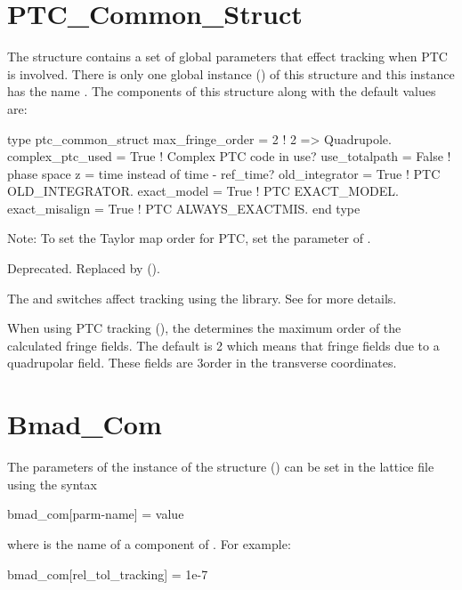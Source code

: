 {%
\section{PTC_Common_Struct}
\label{s:ptc.common}

The  structure contains a set of global parameters that effect tracking when
PTC is involved. There is only one global instance () of this structure and
this instance has the name . The components of this structure along with the default
values are:
\begin{example}
  type ptc_common_struct
    max_fringe_order  = 2   ! 2 => Quadrupole.
    complex_ptc_used = True ! Complex PTC code in use? 
    use_totalpath  = False  ! phase space z = time instead of time - ref_time?
    old_integrator = True   ! PTC OLD_INTEGRATOR.
    exact_model    = True   ! PTC EXACT_MODEL.
    exact_misalign = True   ! PTC ALWAYS_EXACTMIS.
  end type
\end{example}

Note: To set the Taylor map order for PTC, set the  parameter of .

\begin{description}
%
  \item[{parameter[ptc_exact_model]}] \Newline
Deprecated. Replaced by  ().

The  and  switches affect tracking using the 
library. See  for more details.
%
  \item[{ptc_com[max_fringe_order]}] \Newline
When using PTC tracking (), the  determines
the maximum order of the calculated fringe fields. The default is 2 which means that fringe fields
due to a quadrupolar field. These fields are 3\Rd order in the transverse coordinates.
  \end{description}

\section{Bmad_Com}
\label{s:bmad.ptc.com}

The parameters of the  instance of the  structure
() can be set in the lattice file using the syntax
\begin{example}
  bmad_com[parm-name] = value
\end{example}
where  is the name of a component of
. For example:
\begin{example}
  bmad_com[rel_tol_tracking] = 1e-7
\end{example}

}
